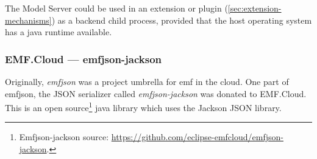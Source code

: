 The Model Server could be used in an extension or plugin (\cref{sec:extension-mechanisms}) as a backend child process, provided that the host operating system has a java runtime available.


\subsubsection{EMF.Cloud --- emfjson-jackson}
Originally, \emph{emfjson} was a project umbrella for \gls{emf} in the \gls{cloud}.
One part of emfjson, the \gls{JSON} serializer called \emph{emfjson-jackson} was donated to EMF.Cloud.
This is an \gls{open source}\footnote{Emfjson-jackson source: \href{https://github.com/eclipse-emfcloud/emfjson-jackson}{https://github.com/eclipse-emfcloud/emfjson-jackson}.} java library which uses the Jackson JSON library.\cite{guillaumehillairetEclipseemfcloudEmfjsonjackson2020}

